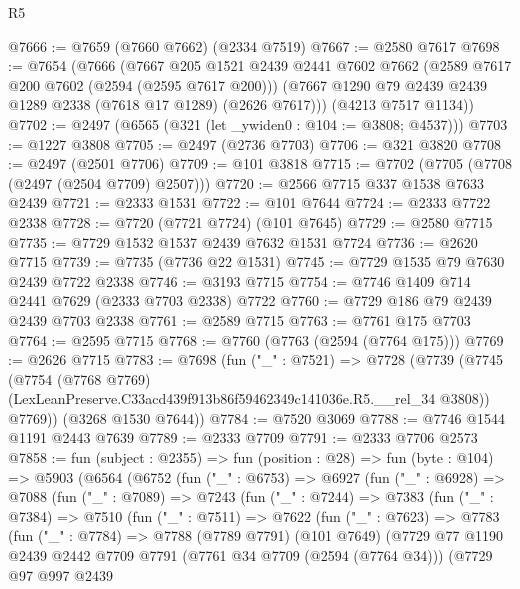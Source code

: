 \begin{lexlean}{R5}
\begin{coremodule}
@7666 := @7659 (@7660 @7662) (@2334 @7519)
@7667 := @2580 @7617
@7698 := @7654
    (@7666
      (@7667
        @205
        @1521
        @2439
        @2441
        @7602
        @7662
        (@2589 @7617 @200 @7602 (@2594 (@2595 @7617 @200)))
        (@7667 @1290 @79 @2439 @2439 @1289 @2338 (@7618 @17 @1289) (@2626 @7617)))
      (@4213 @7517 @1134))
@7702 := @2497 (@6565 (@321 (let _ywiden0 : @104 := @3808; @4537)))
@7703 := @1227 @3808
@7705 := @2497 (@2736 @7703)
@7706 := @321 @3820
@7708 := @2497 (@2501 @7706)
@7709 := @101 @3818
@7715 := @7702 (@7705 (@7708 (@2497 (@2504 @7709) @2507)))
@7720 := @2566 @7715 @337 @1538 @7633 @2439
@7721 := @2333 @1531
@7722 := @101 @7644
@7724 := @2333 @7722 @2338
@7728 := @7720 (@7721 @7724) (@101 @7645)
@7729 := @2580 @7715
@7735 := @7729 @1532 @1537 @2439 @7632 @1531 @7724
@7736 := @2620 @7715
@7739 := @7735 (@7736 @22 @1531)
@7745 := @7729 @1535 @79 @7630 @2439 @7722 @2338
@7746 := @3193 @7715
@7754 := @7746 @1409 @714 @2441 @7629 (@2333 @7703 @2338) @7722
@7760 := @7729 @186 @79 @2439 @2439 @7703 @2338
@7761 := @2589 @7715
@7763 := @7761 @175 @7703
@7764 := @2595 @7715
@7768 := @7760 (@7763 (@2594 (@7764 @175)))
@7769 := @2626 @7715
@7783 := @7698
    (fun ("_" : @7521) =>
    @7728
      (@7739
        (@7745
          (@7754
            (@7768 @7769)
            (LexLeanPreserve.C33acd439f913b86f59462349c141036e.R5.__rel_34 @3808))
          @7769))
      (@3268 @1530 @7644))
@7784 := @7520 @3069
@7788 := @7746 @1544 @1191 @2443 @7639
@7789 := @2333 @7709
@7791 := @2333 @7706 @2573
@7858 := fun (subject : @2355) =>
  fun (position : @28) =>
  fun (byte : @104) =>
  @5903
    (@6564
      (@6752
        (fun ("_" : @6753) =>
        @6927
          (fun ("_" : @6928) =>
          @7088
            (fun ("_" : @7089) =>
            @7243
              (fun ("_" : @7244) =>
              @7383
                (fun ("_" : @7384) =>
                @7510
                  (fun ("_" : @7511) =>
                  @7622
                    (fun ("_" : @7623) =>
                    @7783
                      (fun ("_" : @7784) =>
                      @7788
                        (@7789 @7791)
                        (@101 @7649)
                        (@7729
                          @77
                          @1190
                          @2439
                          @2442
                          @7709
                          @7791
                          (@7761 @34 @7709 (@2594 (@7764 @34)))
                          (@7729
                            @97
                            @997
                            @2439

\end{coremodule}
\end{lexlean}

